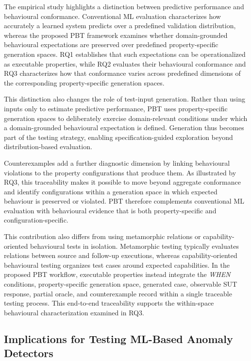 \documentclass[preprint,12pt]{elsarticle}
\begin{document}
The empirical study highlights a distinction between predictive performance
and behavioural conformance. Conventional ML evaluation characterizes how accurately a learned system
predicts over a predefined validation distribution, whereas the proposed PBT
framework examines whether domain-grounded behavioural expectations are
preserved over predefined property-specific generation spaces. RQ1 establishes that such expectations can be operationalized as executable
properties, while RQ2 evaluates their behavioural conformance and RQ3
characterizes how that conformance varies across predefined dimensions of the
corresponding property-specific generation spaces.

This distinction also changes the role of test-input generation. Rather
than using inputs only to estimate predictive performance, PBT uses
property-specific generation spaces to deliberately exercise domain-relevant
conditions under which a domain-grounded behavioural expectation is defined.
Generation thus becomes part of the testing strategy, enabling
specification-guided exploration beyond distribution-based evaluation.

Counterexamples add a further diagnostic dimension by linking behavioural
violations to the property configurations that produce them. As illustrated
by RQ3, this traceability makes it possible to move beyond aggregate
conformance and identify configurations within a generation space in which expected behaviour
is preserved or violated. PBT therefore complements conventional ML evaluation with behavioural
evidence that is both property-specific and configuration-specific.

This contribution also differs from using metamorphic relations or
capability-oriented behavioural tests in isolation. Metamorphic testing
typically evaluates relations between source and follow-up executions,
whereas capability-oriented behavioural testing organizes test cases around
expected capabilities. In the proposed PBT workflow, executable properties
instead integrate the \emph{WHEN} conditions, property-specific generation
space, generated case, observable SUT response, partial oracle, and
counterexample record within a single traceable testing process. This
end-to-end traceability supports the within-space behavioural
characterization examined in RQ3.

\subsection{Implications for Testing ML-Based Anomaly Detectors}
\label{sec:discussion_testing_implications}
\end{document}
